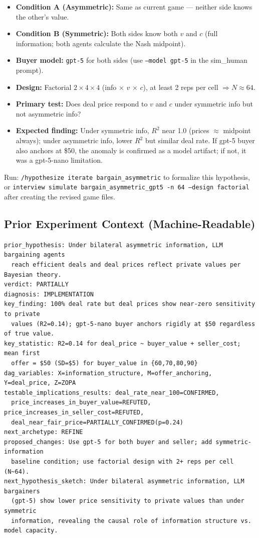 \documentclass[11pt]{article}
\begin{document}
\begin{itemize}
    \item \textbf{Condition A (Asymmetric):} Same as current game --- neither side knows the other's value.
    \item \textbf{Condition B (Symmetric):} Both sides know both $v$ and $c$ (full information; both agents calculate the Nash midpoint).
    \item \textbf{Buyer model:} \texttt{gpt-5} for both sides (use \texttt{--model gpt-5} in the sim\_human prompt).
    \item \textbf{Design:} Factorial $2 \times 4 \times 4$ (info $\times$ $v$ $\times$ $c$), at least 2 reps per cell $\Rightarrow N \approx 64$.
    \item \textbf{Primary test:} Does deal price respond to $v$ and $c$ under symmetric info but not asymmetric info?
    \item \textbf{Expected finding:} Under symmetric info, $R^2$ near 1.0 (prices $\approx$ midpoint always); under asymmetric info, lower $R^2$ but similar deal rate. If gpt-5 buyer also anchors at \$50, the anomaly is confirmed as a model artifact; if not, it was a gpt-5-nano limitation.
\end{itemize}

Run: \texttt{/hypothesize iterate bargain\_asymmetric} to formalize this hypothesis, or \texttt{interview simulate bargain\_asymmetric\_gpt5 -n 64 --design factorial} after creating the revised game files.

\subsection*{Prior Experiment Context (Machine-Readable)}
\begin{verbatim}
prior_hypothesis: Under bilateral asymmetric information, LLM bargaining agents
  reach efficient deals and deal prices reflect private values per Bayesian theory.
verdict: PARTIALLY
diagnosis: IMPLEMENTATION
key_finding: 100% deal rate but deal prices show near-zero sensitivity to private
  values (R2=0.14); gpt-5-nano buyer anchors rigidly at $50 regardless of true value.
key_statistic: R2=0.14 for deal_price ~ buyer_value + seller_cost; mean first
  offer = $50 (SD=$5) for buyer_value in {60,70,80,90}
dag_variables: X=information_structure, M=offer_anchoring, Y=deal_price, Z=ZOPA
testable_implications_results: deal_rate_near_100=CONFIRMED,
  price_increases_in_buyer_value=REFUTED, price_increases_in_seller_cost=REFUTED,
  deal_near_fair_price=PARTIALLY_CONFIRMED(p=0.24)
next_archetype: REFINE
proposed_changes: Use gpt-5 for both buyer and seller; add symmetric-information
  baseline condition; use factorial design with 2+ reps per cell (N~64).
next_hypothesis_sketch: Under bilateral asymmetric information, LLM bargainers
  (gpt-5) show lower price sensitivity to private values than under symmetric
  information, revealing the causal role of information structure vs. model capacity.
\end{verbatim}
\end{document}
